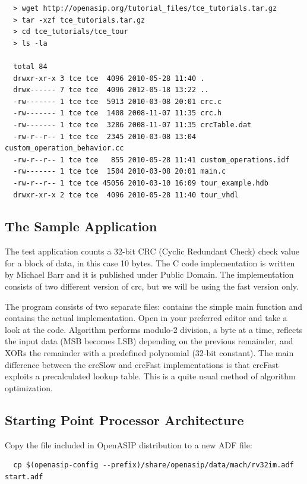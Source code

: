 \documentclass[a4paper,twoside]{tceusermanual}
\begin{document}
\begin{verbatim}
  > wget http://openasip.org/tutorial_files/tce_tutorials.tar.gz
  > tar -xzf tce_tutorials.tar.gz
  > cd tce_tutorials/tce_tour
  > ls -la
  
  total 84
  drwxr-xr-x 3 tce tce  4096 2010-05-28 11:40 .
  drwx------ 7 tce tce  4096 2012-05-18 13:22 ..
  -rw------- 1 tce tce  5913 2010-03-08 20:01 crc.c
  -rw------- 1 tce tce  1408 2008-11-07 11:35 crc.h
  -rw------- 1 tce tce  3286 2008-11-07 11:35 crcTable.dat
  -rw-r--r-- 1 tce tce  2345 2010-03-08 13:04 custom_operation_behavior.cc
  -rw-r--r-- 1 tce tce   855 2010-05-28 11:41 custom_operations.idf
  -rw------- 1 tce tce  1504 2010-03-08 20:01 main.c
  -rw-r--r-- 1 tce tce 45056 2010-03-10 16:09 tour_example.hdb
  drwxr-xr-x 2 tce tce  4096 2010-05-28 11:40 tour_vhdl
\end{verbatim}

\subsection{The Sample Application}

The test application counts a 32-bit CRC (Cyclic Redundant Check)
check value for a block of data, in this case 10 bytes. The C code
implementation is written by Michael Barr and it is published under
Public Domain. The implementation consists of two different version of
crc, but we will be using the fast version only.

The program consists of two separate files:  contains the
simple main function and  contains the actual
implementation. Open  in your preferred editor and take a
look at the code. Algorithm performs modulo-2 division, a byte at a
time, reflects the input data (MSB becomes LSB) depending on the
previous remainder, and XORs the remainder with a predefined
polynomial (32-bit constant). The main difference between the crcSlow
and crcFast implementations is that crcFast exploits a precalculated
lookup table. This is a quite usual method of algorithm optimization.

\subsection{Starting Point Processor Architecture}
\label{subsec:startarc}

Copy the  file included in OpenASIP distribution to a new ADF
file:

\begin{verbatim}
  cp $(openasip-config --prefix)/share/openasip/data/mach/rv32im.adf start.adf
\end{verbatim}
\end{document}

